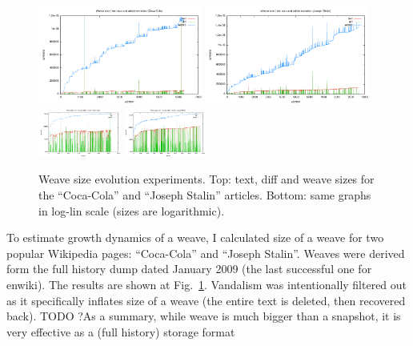 \documentclass{acm_proc_article-sp}
\begin{document}
\begin{figure} \label{fig:weave}
\includegraphics[width=0.48\textwidth]{cocacola-weave_vs_text-linscale.pdf}
\includegraphics[width=0.48\textwidth]{stalin-weave_vs_text-linscale.pdf}
\includegraphics[width=0.24\textwidth]{cocacola-weave_vs_text-logscale.pdf}
\includegraphics[width=0.24\textwidth]{stalin-weave_vs_text-logscale.pdf}
\caption{Weave size evolution experiments. Top: text, diff and weave sizes for the ``Coca-Cola'' and ``Joseph Stalin'' articles. Bottom: same graphs in log-lin scale (sizes are logarithmic).}
\end{figure}
To estimate growth dynamics of a weave, I calculated size
of a weave for two popular Wikipedia pages: ``Coca-Cola''
and ``Joseph Stalin''. Weaves were derived form the full
history dump dated January 2009 (the last successful one
for enwiki). The results are shown at Fig.~\ref{fig:weave}.
Vandalism was intentionally filtered out as it specifically
inflates size of a weave (the entire text is deleted, then
recovered back). TODO
?As a summary, while weave is much bigger than a snapshot,
it is very effective as a (full history) storage format
\end{document}
